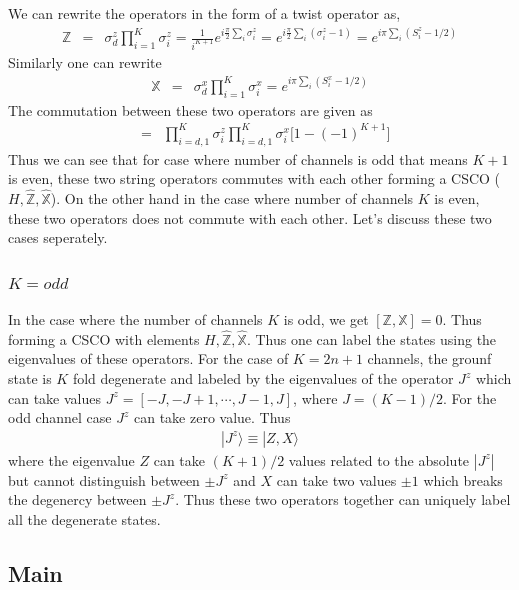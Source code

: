 \documentclass[reprint,prb,superscriptaddress]{revtex4-2}
\begin{document}
We can rewrite the operators in the form of a twist operator as,
\begin{eqnarray}
\mathbb{Z} &=& \sigma_d^z\displaystyle\prod_{i=1}^{K} \sigma_i^z = \frac{1}{i^{K+1}} e^{i\frac{\pi}{2} \sum_{i} \sigma^z_i}=e^{i\frac{\pi}{2} \sum_{i} (\sigma^z_i -1) } =e^{i\pi \sum_{i} (S^z_i -1/2) }
\end{eqnarray}
Similarly one can rewrite
\begin{eqnarray}
\mathbb{X} &=& \sigma_d^x\displaystyle\prod_{i=1}^{K} \sigma_i^x =e^{i\pi \sum_{i} (S^x_i -1/2) }
\end{eqnarray}
The commutation between these two operators are given as
\begin{eqnarray}
[\mathbb{Z},\mathbb{X}] &=& \prod_{i=d,1}^{K} \sigma^z_{i} \prod_{i=d,1}^{K} \sigma^x_{i} \bigg[1-(-1)^{K+1}\bigg]
\end{eqnarray}
Thus we can see that for case where number of channels is odd that means $K+1$ is even, these two string operators commutes with each other forming a CSCO ($H,\hat{\mathbb{Z}},\hat{\mathbb{X}}$). On the other hand in the case where number of channels $K$ is even, these two operators does not commute with each other. Let's discuss these two cases seperately.
\subsubsection{$K=odd$} 
In the case where the number of channels $K$ is odd, we get $[\mathbb{Z},\mathbb{X}]=0$. Thus forming a CSCO with elements $H,\hat{\mathbb{Z}},\hat{\mathbb{X}}$. Thus one can label the states using the eigenvalues of these operators. For the case of $K=2n+1$ channels, the grounf state is $K$ fold degenerate and labeled by the eigenvalues of the operator $J^z$ which can take values $J^z=[-J,-J+1,\cdots, J-1, J]$, where $J=(K-1)/2$. For the odd channel case $J^z$ can take zero value. Thus 
\begin{eqnarray}
|J^z\rangle \equiv |Z,X \rangle
\end{eqnarray}
where the eigenvalue $Z$ can take $(K+1)/2$ values related to the absolute $|J^z|$ but cannot distinguish between $\pm J^z$ and $X$ can take two values $\pm 1$ which breaks the degenercy between $\pm J^z$. Thus these two operators together can uniquely label all the degenerate states.

\subsection{Main}
\end{document}
